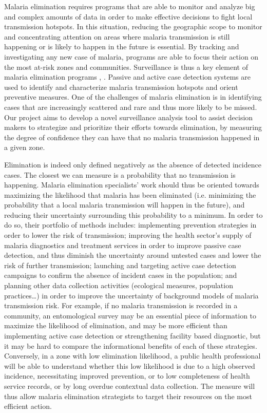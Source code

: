 \documentclass[a4paper,11pt,draft,twoside]{article}
\begin{document}
Malaria elimination requires programs that are able to monitor and analyze big and complex amounts of data in order to make effective decisions to fight local transmission hotspots. In this situation, reducing the geographic scope to monitor and concentrating attention on areas where malaria transmission is still happening or is likely to happen in the future is essential\cite{ShrinkingMalariaMap}. By tracking and investigating any new case of malaria, programs are able to focus their action on the most at-risk zones and communities. Surveillance is thus a key element of malaria elimination programs\cite{SurvSystems} , \cite{WHOSurveillance}. Passive and active case detection systems are used to identify and characterize malaria transmission hotspots and orient preventive measures. One of the challenges of malaria elimination is in identifying cases that are increasingly scattered and rare and thus more likely to be missed\cite{ChangingEpidemiology}. Our project aims to develop a novel surveillance analysis tool to assist decision makers to strategize and prioritize their efforts towards elimination, by measuring the degree of confidence they can have that no malaria transmission happened in a given zone.

Elimination is indeed only defined negatively as the absence of detected incidence cases. The closest we can measure is a probability that no transmission is happening. Malaria elimination specialists' work should thus be oriented towards maximizing the likelihood that malaria has been eliminated (i.e. minimizing the probability that a local malaria transmission will happen in the future), and reducing their uncertainty surrounding this probability to a minimum.  In order to do so, their portfolio of methods includes: implementing prevention strategies in order to lower the risk of transmission; improving the health sector’s supply of malaria diagnostics and treatment services in order to improve passive case detection, and thus diminish the uncertainty around untested cases and lower the risk of further transmission; launching and targeting active case detection campaigns to confirm the absence of incident cases in the population; and planning other data collection activities (ecological measures, population practices…) in order to improve the uncertainty of background models of malaria transmission risk. For example, if no malaria transmission is recorded in a community, an entomological survey may be an essential piece of information to maximize the likelihood of elimination, and may be more efficient than implementing active case detection or strengthening facility based diagnostic, but it may be hard to compare the informational benefits of each of these strategies. Conversely, in a zone with low elimination likelihood, a public health professional will be able to understand whether this low likelihood is due to a high observed incidence, necessitating improved prevention, or to low completeness of health service records, or by long overdue contextual data collection. The measure will thus allow malaria elimination strategists to target their resources on the most efficient action.
\end{document}
